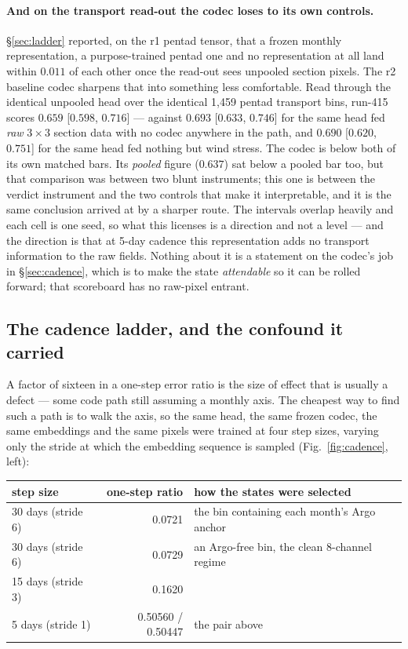 \documentclass[10pt]{article}
\begin{document}
\paragraph{And on the transport read-out the codec loses to its own
controls.} \S\ref{sec:ladder} reported, on the r1 pentad tensor, that a
frozen monthly representation, a purpose-trained pentad one and no
representation at all land within $0.011$ of each other once the read-out
sees unpooled section pixels. The r2 baseline codec sharpens that into
something less comfortable. Read through the identical unpooled head over
the identical 1{,}459 pentad transport bins, run-415 scores $0.659$
[$0.598$, $0.716$] --- against $\mathbf{0.693}$ [$0.633$, $0.746$] for the
same head fed \emph{raw} $3\times3$ section data with no codec anywhere in
the path, and $\mathbf{0.690}$ [$0.620$, $0.751$] for the same head fed
nothing but wind stress. The codec is below both of its own matched bars.
Its \emph{pooled} figure ($0.637$) sat below a pooled bar too, but that
comparison was between two blunt instruments; this one is between the
verdict instrument and the two controls that make it interpretable, and it
is the same conclusion arrived at by a sharper route. The intervals
overlap heavily and each cell is one seed, so what this licenses is a
direction and not a level --- and the direction is that at 5-day cadence
this representation adds no transport information to the raw fields.
Nothing about it is a statement on the codec's job in
\S\ref{sec:cadence}, which is to make the state \emph{attendable} so it
can be rolled forward; that scoreboard has no raw-pixel entrant.

\subsection{The cadence ladder, and the confound it
carried}\label{sec:ladder-cadence}

A factor of sixteen in a one-step error ratio is the size of effect that is
usually a defect --- some code path still assuming a monthly axis. The
cheapest way to find such a path is to walk the axis, so the same head, the
same frozen codec, the same embeddings and the same pixels were trained at
four step sizes, varying only the stride at which the embedding sequence is
sampled (Fig.~\ref{fig:cadence}, left):

\begin{center}\small
\begin{tabular}{lrl}
\toprule
step size & one-step ratio & how the states were selected \\
\midrule
30 days (stride 6) & 0.0721 & the bin containing each month's Argo anchor \\
30 days (stride 6) & 0.0729 & an Argo-free bin, the clean 8-channel regime \\
15 days (stride 3) & 0.1620 & \\
5 days (stride 1) & 0.50560 / 0.50447 & the pair above \\
\bottomrule
\end{tabular}
\end{center}
\end{document}
